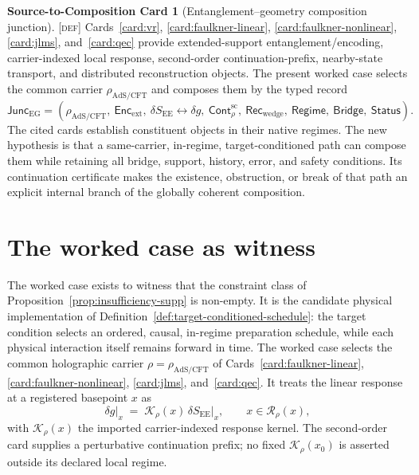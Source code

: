 \documentclass[11pt]{article}
\newcommand{\SEE}{\ensuremath{S_{\mathrm{EE}}}}
\newcommand{\Defn}{\textsc{[def]}}
\theoremstyle{definition}
\newtheorem{compositioncard}{Source-to-Composition Card}
\begin{document}
\begin{compositioncard}[Entanglement--geometry composition junction]
\label{card:entanglement-junction}
\Defn{} Cards~\ref{card:vr}, \ref{card:faulkner-linear},
\ref{card:faulkner-nonlinear}, \ref{card:jlms}, and~\ref{card:qec} provide
extended-support entanglement/encoding, carrier-indexed local response,
second-order continuation-prefix, nearby-state transport, and distributed
reconstruction objects. The present worked case selects the common carrier
$\rho_{\mathrm{AdS/CFT}}$ and composes them by the typed record
\begin{equation}
\mathsf{Junc}_{\mathrm{EG}}=
\left(
\rho_{\mathrm{AdS/CFT}},\ \mathsf{Enc}_{\mathrm{ext}},\ 
\delta S_{\mathrm{EE}}\leftrightarrow\delta g,
\ \mathsf{Cont}^{\mathrm{sc}}_{\rho},\ \mathsf{Rec}_{\mathrm{wedge}},
\ \mathsf{Regime},\ \mathsf{Bridge},\ \mathsf{Status}
\right).
\end{equation}
The cited cards establish constituent objects in their native regimes. The new
hypothesis is that a same-carrier, in-regime, target-conditioned path can compose
them while retaining all bridge, support, history, error, and safety conditions.
Its continuation certificate makes the existence, obstruction, or break of that path
an explicit internal branch of the globally coherent composition.
\end{compositioncard}

\section{The worked case as witness}
\label{supp:case}

The worked case exists to witness that the constraint class of
Proposition~\ref{prop:insufficiency-supp} is non-empty. It is the candidate
physical implementation of Definition~\ref{def:target-conditioned-schedule}: the
target condition selects an ordered, causal, in-regime preparation schedule, while
each physical interaction itself remains forward in time. The worked case selects the common holographic carrier
$\rho=\rho_{\mathrm{AdS/CFT}}$ of Cards~\ref{card:faulkner-linear},
\ref{card:faulkner-nonlinear}, \ref{card:jlms}, and~\ref{card:qec}. It treats the
linear response at a registered basepoint $x$ as
\begin{equation}
\delta g\big|_{x} \;=\; \mathcal K_{\rho}(x)\,\delta\SEE\big|_{x},
\qquad x \in \mathcal R_{\rho}(x),
\label{eq:coupling}
\end{equation}
with $\mathcal K_{\rho}(x)$ the imported carrier-indexed response kernel. The
second-order card supplies a perturbative continuation prefix; no fixed
$\mathcal K_{\rho}(x_0)$ is asserted outside its declared local regime.
\end{document}
